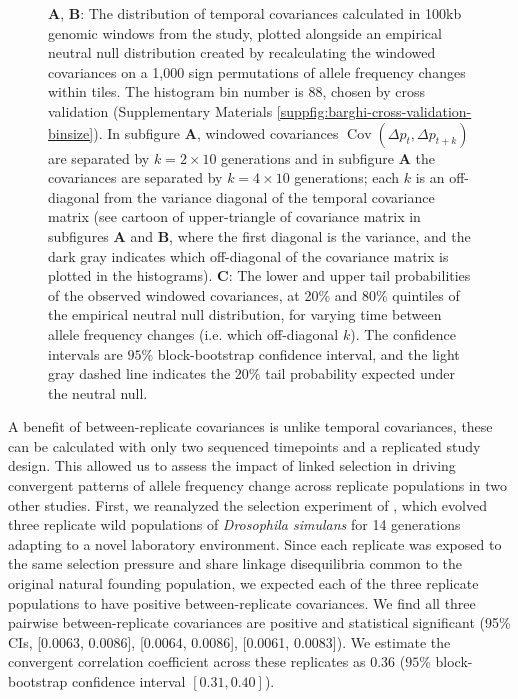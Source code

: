 \documentclass[11pt]{article}
\DeclareMathOperator{\cov}{Cov}
\begin{document}
\begin{figure}[!htb]
  \caption{{\bf A}, {\bf B}: The distribution of temporal covariances
    calculated in 100kb genomic windows from the \textcite{Barghi2019-qy}
    study, plotted alongside an empirical neutral null distribution created by
    recalculating the windowed covariances on a 1,000 sign permutations of
    allele frequency changes within tiles. The histogram bin number is 88,
    chosen by cross validation (Supplementary Materials
    \ref{suppfig:barghi-cross-validation-binsize}). In subfigure {\bf A}, windowed
    covariances $\cov(\Delta p_t, \Delta p_{t+k})$ are separated by $k=2 \times
    10$ generations and in subfigure {\bf A} the covariances are separated by $k=4
    \times 10$ generations; each $k$ is an off-diagonal from the variance
    diagonal of the temporal covariance matrix (see cartoon of upper-triangle
    of covariance matrix in subfigures {\bf A} and {\bf B}, where the first diagonal is the
    variance, and the dark gray indicates which off-diagonal of the covariance
    matrix is plotted in the histograms). {\bf C}: The lower and upper tail
    probabilities of the observed windowed covariances, at 20\% and 80\%
    quintiles of the empirical neutral null distribution, for varying time
    between allele frequency changes (i.e. which off-diagonal $k$). The
  confidence intervals are  $95\%$ block-bootstrap confidence interval, and the
light gray dashed line indicates the 20\% tail probability expected under the
neutral null.}
  
    \label{fig:figure-3} 
\end{figure}


A benefit of between-replicate covariances is unlike temporal covariances,
these can be calculated with only two sequenced timepoints and a replicated
study design. This allowed us to assess the impact of linked selection in
driving convergent patterns of allele frequency change across replicate
populations in two other studies. First, we reanalyzed the selection experiment
of \textcite{Kelly2019-dc}, which evolved three replicate wild populations of
\emph{Drosophila simulans} for 14 generations adapting to a novel laboratory
environment. Since each replicate was exposed to the same selection pressure
and share linkage disequilibria common to the original natural founding
population, we expected each of the three replicate populations to have
positive between-replicate covariances. We find all three pairwise
between-replicate covariances are positive and statistical significant (95\%
CIs, [0.0063, 0.0086], [0.0064, 0.0086], [0.0061, 0.0083]). We estimate the
convergent correlation coefficient across these replicates as 0.36 ($95\%$
block-bootstrap confidence interval $[0.31, 0.40]$).
\end{document}
